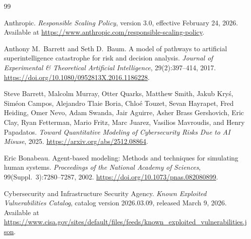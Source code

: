 \documentclass[11pt]{article}
\begin{document}

\begin{thebibliography}{99}

Anthropic.
\textit{Responsible Scaling Policy}, version 3.0, effective February 24, 2026.
Available at \url{https://www.anthropic.com/responsible-scaling-policy}.

Anthony M.~Barrett and Seth D.~Baum.
A model of pathways to artificial superintelligence catastrophe for risk and decision analysis.
\textit{Journal of Experimental \& Theoretical Artificial Intelligence}, 29(2):397--414, 2017.
\url{https://doi.org/10.1080/0952813X.2016.1186228}.

Steve Barrett, Malcolm Murray, Otter Quarks, Matthew Smith, Jakub Kryś, Siméon Campos, Alejandro Tlaie Boria, Chloé Touzet, Sevan Hayrapet, Fred Heiding, Omer Nevo, Adam Swanda, Jair Aguirre, Asher Brass Gershovich, Eric Clay, Ryan Fetterman, Mario Fritz, Marc Juarez, Vasilios Mavroudis, and Henry Papadatos.
\textit{Toward Quantitative Modeling of Cybersecurity Risks Due to AI Misuse}, 2025.
\url{https://arxiv.org/abs/2512.08864}.


Eric Bonabeau.
Agent-based modeling: Methods and techniques for simulating human systems.
\textit{Proceedings of the National Academy of Sciences}, 99(Suppl.~3):7280--7287, 2002.
\url{https://doi.org/10.1073/pnas.082080899}.

Cybersecurity and Infrastructure Security Agency.
\textit{Known Exploited Vulnerabilities Catalog}, catalog version 2026.03.09, released March 9, 2026.
Available at \url{https://www.cisa.gov/sites/default/files/feeds/known_exploited_vulnerabilities.json}.


\end{thebibliography}
\end{document}

